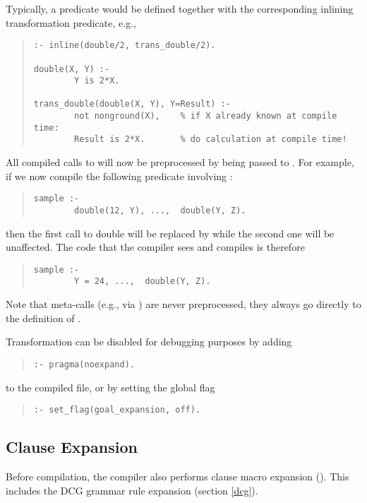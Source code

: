 Typically, a predicate would be defined together with the corresponding
inlining transformation predicate, e.g.,
\begin{quote}
\begin{verbatim}
:- inline(double/2, trans_double/2).

double(X, Y) :-
        Y is 2*X.

trans_double(double(X, Y), Y=Result) :-
        not nonground(X),    % if X already known at compile time:
        Result is 2*X.       % do calculation at compile time!
\end{verbatim}
\end{quote}
All compiled calls to  will now be preprocessed by being
passed
to .
For example, if we now compile the following predicate involving
:
\begin{quote}
\begin{verbatim}
sample :-
        double(12, Y), ...,  double(Y, Z).
\end{verbatim}
\end{quote}
then the first call to double will be replaced by  while the
second one will be unaffected. The code that the compiler sees and
compiles is therefore
\begin{quote}
\begin{verbatim}
sample :-
        Y = 24, ...,  double(Y, Z).
\end{verbatim}
\end{quote}
Note that meta-calls (e.g., via
) are never
preprocessed, they always go directly to the definition of .

Transformation can be disabled for debugging purposes by adding
\begin{quote}
\begin{verbatim}
:- pragma(noexpand).
\end{verbatim}
\end{quote}
to the compiled file, or by setting the global flag
\begin{quote}
\begin{verbatim}
:- set_flag(goal_expansion, off).
\end{verbatim}
\end{quote}


\subsection{Clause Expansion}
Before compilation, the compiler also performs clause macro expansion
().  This includes
the DCG grammar rule expansion (section \ref{dcg}).



